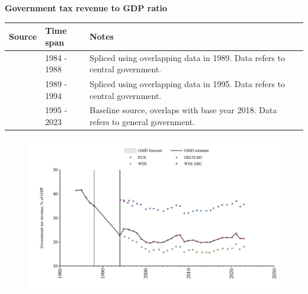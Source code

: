 \documentclass[12pt,a4paper,landscape]{article}
\begin{document}
\begin{adjustbox}{max totalsize={\paperwidth}{\paperheight},center}
\begin{minipage}[t][\textheight][t]{\textwidth}
\vspace*{0.5cm}
{}
\begin{center}
{\Large\bfseries Government tax revenue to GDP ratio}
\end{center}
\vspace{0.5cm}
\begin{table}[H]
\centering
\small
\begin{tabular}{|l|l|l|}
\hline
\textbf{Source} & \textbf{Time span} & \textbf{Notes} \\
\hline
\rowcolor{white}\cite{WDI_ARC}& 1984 - 1988 &Spliced using overlapping data in 1989. Data refers to central government.\\
\rowcolor{lightgray}\cite{WDI}& 1989 - 1994 &Spliced using overlapping data in 1995. Data refers to central government.\\
\rowcolor{white}\cite{OECD_EO}& 1995 - 2023 &Baseline source, overlaps with base year 2018. Data refers to general government.\\
\hline
\end{tabular}
\end{table}
\begin{figure}[H]
\centering
\includegraphics[width=\textwidth,height=0.6\textheight,keepaspectratio]{graphs/POL_govtax_GDP.pdf}
\end{figure}
\end{minipage}
\end{adjustbox}
\end{document}
